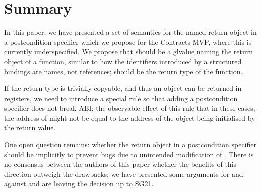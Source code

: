 \section{Summary}

In this paper, we have presented a set of semantics for the named return object  in a postcondition specifier  which we propose for the Contracts MVP, where this is currently underspecified. We propose that  should be a glvalue naming the return object of a function, similar to how the identifiers introduced by a structured bindings are names, not references;  should be the return type of the function.

If the return type is trivially copyable, and thus an object can be returned in registers, we need to introduce a special rule so that adding a postcondition specifier does not break ABI; the observable effect of this rule that in these cases, the address of  might not be equal to the address of the object being initialised by the return value.

One open question remains: whether the return object  in a postcondition specifier should be implicitly  to prevent bugs due to unintended modification of . There is no consensus between the authors of this paper whether the benefits of this direction outweigh the drawbacks; we have presented some arguments for and against and are leaving the decision up to SG21.






\renewcommand{\bibname}{References}




